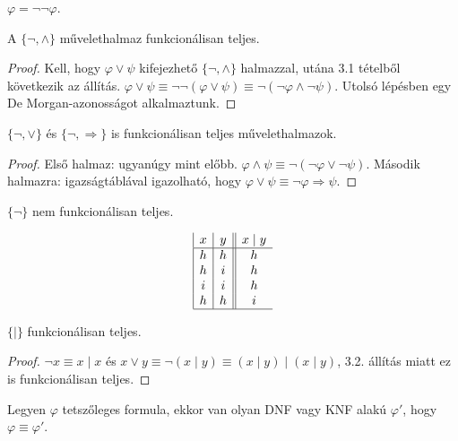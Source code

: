 \begin{exmpl} $\varphi = \lnot \lnot \varphi$.
\end{exmpl}
\begin{state} A $\lbrace \lnot, \land \rbrace$ művelethalmaz funkcionálisan teljes.
\end{state}
\begin{proof} Kell, hogy $\varphi \lor \psi$ kifejezhető $\lbrace \lnot, \land \rbrace$ halmazzal, utána 3.1 tételből következik az állítás.
$\varphi \lor \psi \equiv \lnot \lnot (\varphi \lor \psi) \equiv \lnot (\lnot \varphi \land \lnot \psi)$. Utolsó lépésben egy De Morgan-azonosságot alkalmaztunk.
\end{proof}
\begin{state} $\lbrace \lnot, \lor \rbrace$ és $\lbrace \lnot, \Rightarrow \rbrace$ is funkcionálisan teljes művelethalmazok.
\end{state}
\begin{proof} Első halmaz: ugyanúgy mint előbb. $\varphi \land \psi \equiv \lnot(\lnot \varphi \lor \lnot \psi)$. Második halmazra: igazságtáblával igazolható, hogy $\varphi \lor \psi \equiv \lnot \varphi \Rightarrow \psi$.
\end{proof}
\begin{fairytale} $\lbrace \lnot \rbrace$ nem funkcionálisan teljes.
\end{fairytale}
\begin{defi}
\begin{displaymath}
\begin{array}{|c|c||c}
   x
 & y
 & x \mid y  \\
\hline
h & h & h \\
h & i & h \\
i & i & h \\
h & h & i \\
\hline
\end{array}
\end{displaymath}
\end{defi}
\begin{state}
$\lbrace \mid \rbrace$ funkcionálisan teljes.
\end{state}
\begin{proof}
$\lnot x \equiv x \mid x$ és $x \lor y \equiv \lnot (x \mid y) \equiv (x \mid y) \mid (x \mid y)$, 3.2. állítás miatt ez is funkcionálisan teljes.
\end{proof}
\begin{state}Legyen $\varphi$ tetszőleges formula, ekkor van olyan DNF vagy KNF alakú $\varphi'$, hogy $\varphi \equiv \varphi'$.
\end{state}
